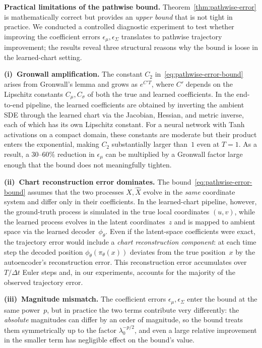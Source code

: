 \documentclass[11pt]{article}
\begin{document}
\noindent\textbf{Practical limitations of the pathwise bound.}
Theorem~\ref{thm:pathwise-error} is mathematically correct but
provides an \emph{upper bound} that is not tight in practice.
We conducted a controlled diagnostic experiment to test whether
improving the coefficient errors
$\epsilon_\mu,\epsilon_\Sigma$ translates to pathwise trajectory
improvement; the results reveal three structural reasons why the
bound is loose in the learned-chart setting.

\medskip\noindent\textbf{(i)~Gronwall amplification.}
The constant $C_2$ in~\eqref{eq:pathwise-error-bound} arises from
Gronwall's lemma and grows as $e^{C' T}$, where $C'$ depends on the
Lipschitz constants $C_\mu,C_\sigma$ of both the true and learned
coefficients.
In the end-to-end pipeline, the learned coefficients are obtained
by inverting the ambient SDE through the learned chart via the Jacobian,
Hessian, and metric inverse, each of which has its own Lipschitz constant.
For a neural network with Tanh activations on a compact domain, these
constants are moderate but their product enters the exponential,
making $C_2$ substantially larger than~$1$ even at $T=1$.
As a result, a $30$--$60\%$ reduction in $\epsilon_\mu$ can be
multiplied by a Gronwall factor large enough that the bound
does not meaningfully tighten.

\medskip\noindent\textbf{(ii)~Chart reconstruction error dominates.}
The bound~\eqref{eq:pathwise-error-bound} assumes that the two
processes $X,\hat X$ evolve in the \emph{same} coordinate
system and differ only in their coefficients.
In the learned-chart pipeline, however, the ground-truth process is
simulated in the true local coordinates $(u,v)$, while the learned
process evolves in the latent coordinates~$z$ and is mapped to ambient
space via the learned decoder~$\phi_\theta$.
Even if the latent-space coefficients were exact, the trajectory
error would include a \emph{chart reconstruction component}:
at each time step the decoded position
$\phi_\theta(\pi_\theta(x))$ deviates from the true position~$x$
by the autoencoder's reconstruction error.
This reconstruction error accumulates over $T/\Delta t$ Euler
steps and, in our experiments, accounts for the majority of the
observed trajectory error.

\medskip\noindent\textbf{(iii)~Magnitude mismatch.}
The coefficient errors $\epsilon_\mu,\epsilon_\Sigma$ enter the
bound at the same power~$p$, but in practice the two terms
contribute very differently: the
\emph{absolute} magnitudes can differ by an order of magnitude,
so the bound treats them symmetrically up to the factor
$\lambda_0^{-p/2}$, and even a large relative improvement in the
smaller term has negligible effect on the bound's value.
\end{document}
